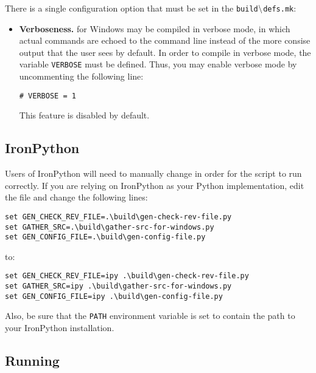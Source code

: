 

There is a single configuration option that must be set in the
{\tt build$\backslash$defs.mk}:
\begin{itemize}
\item {\bf Verboseness.}
\libflame for Windows may be compiled in verbose mode, in which actual commands
are echoed to the command line instead of the more consise output that the user
sees by default.
In order to compile in verbose mode, the variable {\tt VERBOSE} must be defined.
Thus, you may enable verbose mode by uncommenting the following line:
\begin{Verbatim}[frame=single,framesep=2.5mm,xleftmargin=5mm,fontsize=\footnotesize]
# VERBOSE = 1
\end{Verbatim}
This feature is disabled by default.
\end{itemize}



\subsection{IronPython}

Users of IronPython will need to manually change \configurecmd in order for the
script to run correctly.
If you are relying on IronPython as your Python implementation, edit the
\configurecmd file and change the following lines:

\begin{Verbatim}[frame=single,framesep=2.5mm,xleftmargin=5mm,fontsize=\footnotesize]
set GEN_CHECK_REV_FILE=.\build\gen-check-rev-file.py
set GATHER_SRC=.\build\gather-src-for-windows.py
set GEN_CONFIG_FILE=.\build\gen-config-file.py
\end{Verbatim}

\noindent
to:

\begin{Verbatim}[frame=single,framesep=2.5mm,xleftmargin=5mm,fontsize=\footnotesize]
set GEN_CHECK_REV_FILE=ipy .\build\gen-check-rev-file.py
set GATHER_SRC=ipy .\build\gather-src-for-windows.py
set GEN_CONFIG_FILE=ipy .\build\gen-config-file.py
\end{Verbatim}

\noindent
Also, be sure that the {\tt PATH} environment variable is set to contain the
path to your IronPython installation.


\subsection{Running \configurecmd}
\label{sec:running-configure-win}

